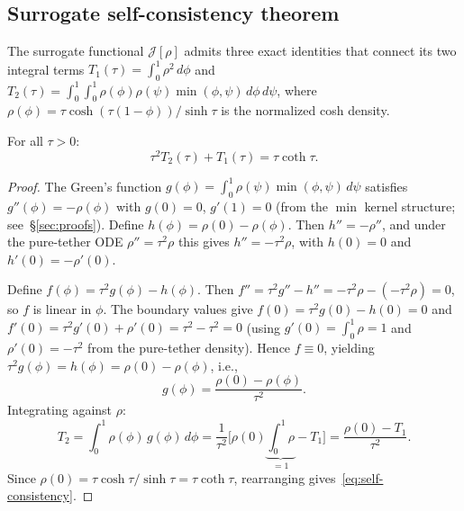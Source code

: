 \subsection{Surrogate self-consistency theorem}
\label{sec:self-consistency}

The surrogate functional $\mathcal{J}[\rho]$ admits three exact identities that connect its two integral terms $T_1(\tau) = \int_0^1 \rho^2\,d\phi$ and $T_2(\tau) = \int_0^1\!\!\int_0^1 \rho(\phi)\rho(\psi)\min(\phi,\psi)\,d\phi\,d\psi$, where $\rho(\phi) = \tau\cosh(\tau(1{-}\phi))/\sinh\tau$ is the normalized cosh density.

\begin{theorem}
\label{thm:self-consistency}
For all $\tau > 0$:
\begin{equation}
\tau^2 T_2(\tau) + T_1(\tau) = \tau\coth\tau.
\label{eq:self-consistency}
\end{equation}
\end{theorem}

\begin{proof}
The Green's function $g(\phi) = \int_0^1 \rho(\psi)\min(\phi,\psi)\,d\psi$ satisfies $g''(\phi) = -\rho(\phi)$ with $g(0) = 0$, $g'(1) = 0$ (from the $\min$ kernel structure; see~\S\ref{sec:proofs}). Define $h(\phi) = \rho(0) - \rho(\phi)$. Then $h'' = -\rho''$, and under the pure-tether ODE $\rho'' = \tau^2\rho$ this gives $h'' = -\tau^2\rho$, with $h(0) = 0$ and $h'(0) = -\rho'(0)$.

Define $f(\phi) = \tau^2 g(\phi) - h(\phi)$. Then $f'' = \tau^2 g'' - h'' = -\tau^2\rho - (-\tau^2\rho) = 0$, so $f$ is linear in $\phi$. The boundary values give $f(0) = \tau^2 g(0) - h(0) = 0$ and $f'(0) = \tau^2 g'(0) + \rho'(0) = \tau^2 - \tau^2 = 0$ (using $g'(0) = \int_0^1\rho = 1$ and $\rho'(0) = -\tau^2$ from the pure-tether density). Hence $f \equiv 0$, yielding $\tau^2 g(\phi) = h(\phi) = \rho(0) - \rho(\phi)$, i.e.,
\begin{equation}
g(\phi) = \frac{\rho(0) - \rho(\phi)}{\tau^2}.
\label{eq:green-identity}
\end{equation}
Integrating against $\rho$:
\begin{equation}
T_2 = \int_0^1 \rho(\phi)\,g(\phi)\,d\phi = \frac{1}{\tau^2}\bigl[\rho(0)\underbrace{\int_0^1\!\rho}_{=1} - T_1\bigr]
= \frac{\rho(0) - T_1}{\tau^2}.
\end{equation}
Since $\rho(0) = \tau\cosh\tau/\sinh\tau = \tau\coth\tau$, rearranging gives~\eqref{eq:self-consistency}.
\end{proof}

